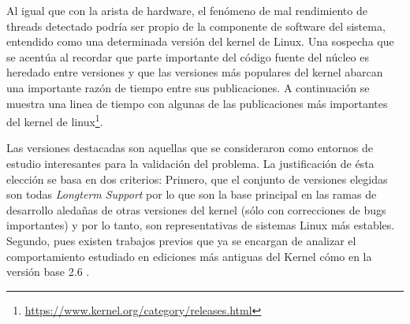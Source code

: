 Al igual que con la arista de hardware, el fenómeno de mal rendimiento de threads detectado podría ser propio de la componente de software del sistema, entendido como una determinada versión del kernel de Linux. Una sospecha que se acentúa al recordar que parte importante del código fuente del núcleo es heredado entre versiones y que las versiones más populares del kernel abarcan una importante razón de tiempo entre sus publicaciones. A continuación se muestra una linea de tiempo con algunas de las publicaciones más importantes del kernel de linux\footnote{\url{https://www.kernel.org/category/releases.html}}.


\begin{center}
\end{center}

Las versiones destacadas son aquellas que se consideraron como entornos de estudio interesantes para la validación del problema. La justificación de ésta elección se basa en dos criterios: Primero, que el conjunto de versiones elegidas son todas \emph{Longterm Support} por lo que son la base principal en las ramas de desarrollo aledañas de otras versiones del kernel (sólo con correcciones de bugs importantes) y por lo tanto, son representativas de sistemas Linux más estables. Segundo, pues existen trabajos previos que ya se encargan de analizar el comportamiento estudiado en ediciones más antiguas del Kernel cómo en la versión base 2.6 \cite{tesis:diegoDCC}.

